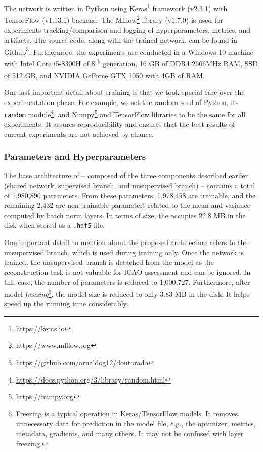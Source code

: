 The network is written in Python using Keras\footnote{\url{https://keras.io}} framework (v2.3.1) with TensorFlow (v1.13.1) backend. The Mlflow\footnote{\url{https://www.mlflow.org}} library (v1.7.0) is used for experiments tracking/comparison and logging of hyperparameters, metrics, and artifacts. The source code, along with the trained network, can be found in Github\footnote{\url{https://github.com/arnaldog12/doutorado}}. Furthermore, the experiments are conducted in a Windows 10 machine with Intel\textsuperscript{\tiny\textregistered} Core\textsuperscript{\tiny\texttrademark} i5-8300H of 8\textsuperscript{th} generation, 16 GB of DDR4 2666MHz RAM, SSD of 512 GB, and NVIDIA\textsuperscript{\tiny\textregistered} GeForce\textsuperscript{\tiny\textregistered} GTX 1050 with 4GB of RAM.

One last important detail about \methodname training is that we took special care over the experimentation phase. For example, we set the random seed of Python, its \texttt{random} module\footnote{\url{https://docs.python.org/3/library/random.html}}, and Numpy\footnote{\url{https://numpy.org}} and TensorFlow libraries to be the same for all experiments. It assures reproducibility and ensures that the best results of current experiments are not achieved by chance.

\subsubsection{Parameters and Hyperparameters} \label{sec:hyperparams}

The base architecture of \methodname -- composed of the three components described earlier (shared network, supervised branch, and unsupervised branch) -- contains a total of 1,980,890 parameters. From these parameters, 1,978,458 are trainable, and the remaining 2,432 are non-trainable parameters related to the mean and variance computed by batch norm layers. In terms of size, the \methodname occupies 22.8 MB in the disk when stored as a \texttt{.hdf5} file.

One important detail to mention about the proposed architecture refers to the unsupervised branch, which is used during training only. Once the network is trained, the unsupervised branch is detached from the model as the reconstruction task is not valuable for ICAO assessment and can be ignored. In this case, the number of parameters is reduced to 1,000,727. Furthermore, after model \textit{freezing}\footnote{Freezing is a typical operation in Keras/TensorFlow models. It removes unnecessary data for prediction in the model file, e.g., the optimizer, metrics, metadata, gradients, and many others. It may not be confused with layer freezing.}, the model size is reduced to only 3.83 MB in the disk. It helps speed up the running time considerably.

